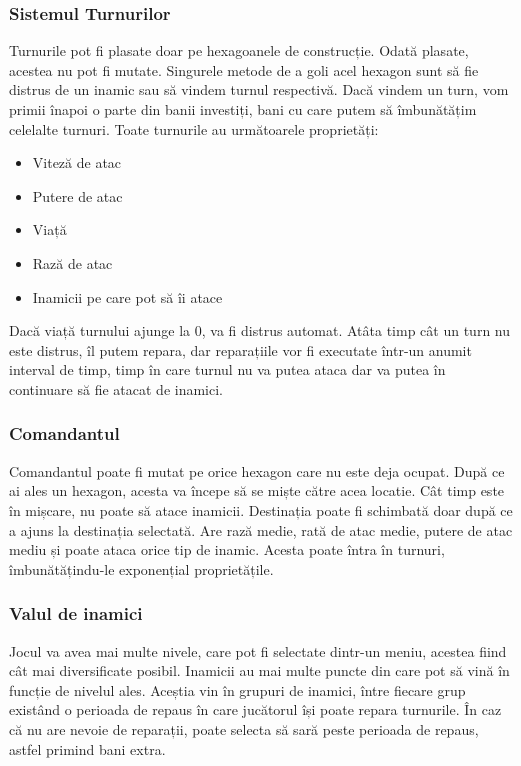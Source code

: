 \documentclass[12pt, a4paper]{article}
\begin{document}
	
	
	
	\subsubsection{Sistemul Turnurilor}
	
	Turnurile pot fi plasate doar pe hexagoanele de construcție. Odată plasate, acestea nu pot fi mutate. Singurele metode de a goli acel hexagon sunt să fie distrus de un inamic sau să vindem turnul respectivă. Dacă vindem un turn, vom primii înapoi o parte din banii investiți, bani cu care putem să îmbunătățim celelalte turnuri. Toate turnurile au următoarele proprietăți:
	\begin{itemize}
		\item Viteză de atac
		\item Putere de atac
		\item Viață
		\item Rază de atac
		\item Inamicii pe care pot să îi atace
	\end{itemize}
	
	Dacă viață turnului ajunge la 0, va fi distrus automat. Atâta timp cât un turn nu este distrus, îl putem repara, dar reparațiile vor fi executate într-un anumit interval de timp, timp în care turnul nu va putea ataca dar va putea în continuare să fie atacat de inamici.
	
	
	
	
	
	\subsubsection{Comandantul}
	
	Comandantul poate fi mutat pe orice hexagon care nu este deja ocupat. După ce ai ales un hexagon, acesta va începe să se miște către acea locatie. Cât timp este în mișcare, nu poate să atace inamicii. Destinația poate fi schimbată doar după ce a ajuns la destinația selectată. Are rază medie, rată de atac medie, putere de atac mediu și poate ataca orice tip de inamic. Acesta poate întra în turnuri, îmbunătățindu-le exponențial proprietățile.
	
	
	
	\subsubsection{Valul de inamici}
	
	Jocul va avea mai multe nivele, care pot fi selectate dintr-un meniu, acestea fiind cât mai diversificate posibil. Inamicii au mai multe puncte din care pot să vină în funcție de nivelul ales. Aceștia vin în grupuri de inamici, între fiecare grup existând o perioada de repaus în care jucătorul își poate repara turnurile. În caz că nu are nevoie de reparații, poate selecta să sară peste perioada de repaus, astfel primind bani extra.
	
\end{document}
